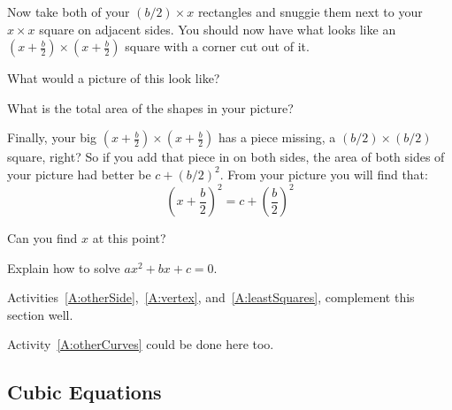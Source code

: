 Now take both of your $(b/2)\times x$ rectangles and snuggie them
next to your $x\times x$ square on adjacent sides. You should now have
what looks like an $(x + \frac{b}{2}) \times (x +
\frac{b}{2})$ square with a corner cut out of it.


\begin{question} What would a picture of this look like?
\end{question}
\QM

\begin{question} What is the total area of the shapes in your picture?
\end{question}
\QM

Finally, your big $(x + \frac{b}{2}) \times (x + \frac{b}{2})$ has a
piece missing, a $(b/2) \times (b/2)$ square, right? So if you add
that piece in on both sides, the area of both sides of your picture
had better be $c + (b/2)^2$. From your picture you will find that:
\[
\left(x + \frac{b}{2}\right)^2 = c + \left(\frac{b}{2}\right)^2
\]

\begin{question} 
Can you find $x$ at this point?
\end{question}
\QM

\begin{question}
Explain how to solve $ax^2 + bx + c = 0$.
\end{question}
\QM




\begin{teachingnote}
Activities~\ref{A:otherSide},~\ref{A:vertex}, and~\ref{A:leastSquares},
complement this section well.
\end{teachingnote}

\begin{teachingnote}
Activity~\ref{A:otherCurves} could be done here too.
\end{teachingnote}

\subsection{Cubic Equations}


